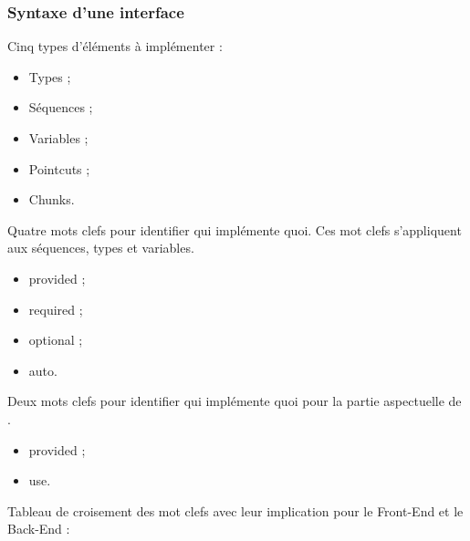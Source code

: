 \documentclass[]{beamer}
\begin{document}
\begin{frame}
\frametitle{Syntaxe d'une interface}
 {
    Cinq types d'éléments à implémenter :
    \begin{itemize}
        \item Types ;
        \item Séquences ;
        \item Variables ;
        \item Pointcuts ;
        \item Chunks.
    \end{itemize}
}
 {
    Quatre mots clefs pour identifier qui implémente quoi.
    Ces mot clefs s'appliquent aux séquences, types et variables.
    \begin{itemize}
        \item provided ;
        \item required ;
        \item optional ;
        \item auto.
    \end{itemize}
}
 {
    Deux mots clefs pour identifier qui implémente quoi pour la partie
    aspectuelle de \rtx.
    \begin{itemize}
        \item provided ;
        \item use.
    \end{itemize}
}
 {
    Tableau de croisement des mot clefs avec leur implication pour le
    Front-End et le Back-End :
}

\end{frame}
\end{document}
